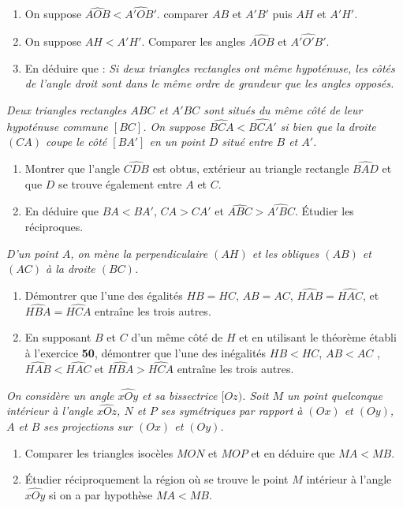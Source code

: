 \begin{itemize}
\begin{enumerate}
\item On suppose $\widehat{AOB}<\widehat{A'OB'}$. comparer $AB$ et $A'B'$ puis $AH$ et $A'H'$.
\item On suppose $AH<A'H'$. Comparer les angles $\widehat{AOB}$ et $\widehat{A'O'B'}$.
\item En déduire que : \emph{Si deux triangles rectangles ont même hypoténuse, les côtés de l'angle droit sont dans le même ordre de grandeur que les angles opposés.}
\end{enumerate}
\it Deux triangles rectangles $ABC$ et $A'BC$ sont situés du même côté de leur hypoténuse commune $[BC]$. 
On suppose $\widehat{BCA}<\widehat{BCA'}$ si bien que la droite $(CA)$ coupe le côté $[BA']$ en un point $D$ situé entre $B$ et $A'$.\begin{enumerate}
\item Montrer que l'angle $\widehat{CDB}$ est obtus, extérieur au triangle rectangle $\widehat{BAD}$ et que $D$ se trouve également entre $A$ et $C$.
\item En déduire que $BA<BA'$, $CA>CA'$ et $\widehat{ABC}>\widehat{A'BC}$. Étudier les réciproques.
\end{enumerate}
\it D'un point $A$, on mène la perpendiculaire $(AH)$ et les obliques $(AB)$ et $(AC)$ à la droite $(BC)$. \begin{enumerate}
\item Démontrer que l'une des égalités $HB=HC$, $AB=AC$, $\widehat{HAB}=\widehat{HAC}$, et $\widehat{HBA}=\widehat{HCA}$ entraîne les trois autres.
\item En supposant $B$ et $C$ d'un même côté de $H$ et en utilisant le théorème établi à l'exercice \textbf{50}, démontrer que l'une des inégalités $HB<HC$, $AB<AC$ , $\widehat{HAB}<\widehat{HAC}$ et $\widehat{HBA}>\widehat{HCA}$ entraîne les trois autres.
\end{enumerate}
\it On considère un angle $\widehat{xOy}$ et sa bissectrice $[Oz)$. Soit $M$ un point quelconque intérieur à l'angle $\widehat{xOz}$, $N$ et $P$ ses symétriques par rapport à $(Ox)$ et $(Oy)$, $A$ et $B$ ses projections sur $(Ox)$ et $(Oy)$. 
\begin{enumerate}
\item Comparer les triangles isocèles $MON$ et $MOP$ et en déduire que $MA<MB$.
\item Étudier réciproquement la région où se trouve le point $M$ intérieur à l'angle $\widehat{xOy}$ si on a par hypothèse $MA<MB$.
\end{enumerate}

\end{itemize}
